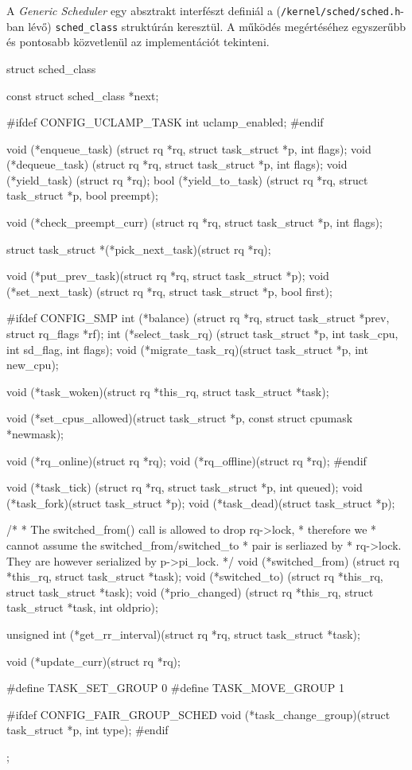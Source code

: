 A \textit{Generic Scheduler} egy absztrakt interfészt definiál a (\texttt{/kernel/sched/sched.h}-ban lévő) \texttt{sched\_class} struktúrán keresztül. A működés megértéséhez egyszerűbb és pontosabb közvetlenül az implementációt tekinteni.
\begin{cpp}
struct sched_class {
	const struct sched_class *next;

#ifdef CONFIG_UCLAMP_TASK
	int uclamp_enabled;
#endif

	void (*enqueue_task)
		(struct rq *rq, struct task_struct *p, int flags);
	void (*dequeue_task)
		(struct rq *rq, struct task_struct *p, int flags);
	void (*yield_task)   (struct rq *rq);
	bool (*yield_to_task)
		(struct rq *rq, struct task_struct *p, bool preempt);

	void (*check_preempt_curr)
		(struct rq *rq, struct task_struct *p, int flags);

	struct task_struct *(*pick_next_task)(struct rq *rq);

	void (*put_prev_task)(struct rq *rq, struct task_struct *p);
	void (*set_next_task)
		(struct rq *rq, struct task_struct *p, bool first);

#ifdef CONFIG_SMP
	int (*balance)
	  (struct rq *rq, struct task_struct *prev, struct rq_flags *rf);
	int  (*select_task_rq)
	  (struct task_struct *p, int task_cpu, int sd_flag, int flags);
	void (*migrate_task_rq)(struct task_struct *p, int new_cpu);

	void (*task_woken)(struct rq *this_rq, struct task_struct *task);

	void (*set_cpus_allowed)(struct task_struct *p,
				 const struct cpumask *newmask);

	void (*rq_online)(struct rq *rq);
	void (*rq_offline)(struct rq *rq);
#endif

	void (*task_tick)
		(struct rq *rq, struct task_struct *p, int queued);
	void (*task_fork)(struct task_struct *p);
	void (*task_dead)(struct task_struct *p);

	/*
	 * The switched_from() call is allowed to drop rq->lock, 
	 * therefore we
	 * cannot assume the switched_from/switched_to 
	 * pair is serliazed by
	 * rq->lock. They are however serialized by p->pi_lock.
	 */
	void (*switched_from)
		(struct rq *this_rq, struct task_struct *task);
	void (*switched_to) 
		(struct rq *this_rq, struct task_struct *task);
	void (*prio_changed)
		(struct rq *this_rq, struct task_struct *task,
			      int oldprio);

	unsigned int (*get_rr_interval)(struct rq *rq,
					struct task_struct *task);

	void (*update_curr)(struct rq *rq);

#define TASK_SET_GROUP		0
#define TASK_MOVE_GROUP		1

#ifdef CONFIG_FAIR_GROUP_SCHED
	void (*task_change_group)(struct task_struct *p, int type);
#endif
};

\end{cpp}
 
